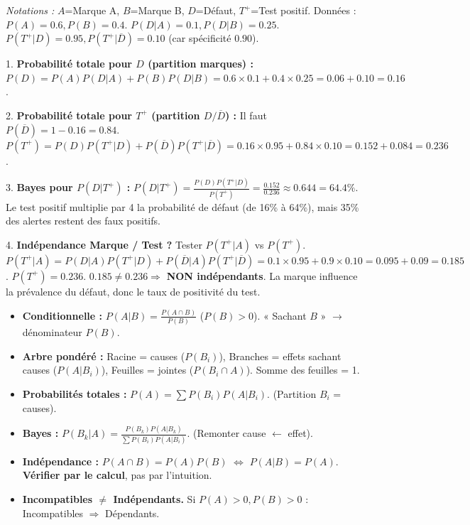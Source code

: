 \documentclass[11pt]{article}
\begin{document}
\begin{corrige}
\emph{Notations :} $A$=Marque A, $B$=Marque B, $D$=Défaut, $T^+$=Test positif.
Données : $P(A)=\num{0,6}, P(B)=\num{0,4}$. $P(D|A)=\num{0,1}, P(D|B)=\num{0,25}$.
$P(T^+|D)=\num{0,95}, P(T^+|\overline{D})=\num{0,10}$ (car spécificité $\num{0,90}$).

1. \textbf{Probabilité totale pour $D$ (partition marques) :}
$P(D) = P(A)P(D|A) + P(B)P(D|B) = \num{0,6}\times\num{0,1} + \num{0,4}\times\num{0,25} = \num{0,06} + \num{0,10} = \num{0,16}$.

2. \textbf{Probabilité totale pour $T^+$ (partition $D/\overline{D}$) :}
Il faut $P(\overline{D}) = 1 - \num{0,16} = \num{0,84}$.
$P(T^+) = P(D)P(T^+|D) + P(\overline{D})P(T^+|\overline{D}) = \num{0,16}\times\num{0,95} + \num{0,84}\times\num{0,10} = \num{0,152} + \num{0,084} = \num{0,236}$.

3. \textbf{Bayes pour $P(D|T^+)$ :}
$P(D|T^+) = \frac{P(D)P(T^+|D)}{P(T^+)} = \frac{\num{0,152}}{\num{0,236}} \approx \num{0,644} = \num{64,4}\%$.
Le test positif multiplie par 4 la probabilité de défaut (de \num{16}\% à \num{64}\%), mais \num{35}\% des alertes restent des faux positifs.

4. \textbf{Indépendance Marque / Test ?}
Tester $P(T^+|A)$ vs $P(T^+)$.
$P(T^+|A) = P(D|A)P(T^+|D) + P(\overline{D}|A)P(T^+|\overline{D}) = \num{0,1}\times\num{0,95} + \num{0,9}\times\num{0,10} = \num{0,095} + \num{0,09} = \num{0,185}$.
$P(T^+) = \num{0,236}$.
$\num{0,185} \neq \num{0,236} \Rightarrow$ \textbf{NON indépendants}. La marque influence la prévalence du défaut, donc le taux de positivité du test.
\end{corrige}

\begin{aretenir}
\begin{itemize}
    \item \textbf{Conditionnelle :} $P(A|B) = \frac{P(A\cap B)}{P(B)}$ ($P(B)>0$). « Sachant $B$ » $\to$ dénominateur $P(B)$.
    \item \textbf{Arbre pondéré :} Racine = causes ($P(B_i)$), Branches = effets sachant causes ($P(A|B_i)$), Feuilles = jointes ($P(B_i\cap A)$). Somme des feuilles = 1.
    \item \textbf{Probabilités totales :} $P(A) = \sum P(B_i)P(A|B_i)$. (Partition $B_i$ = causes).
    \item \textbf{Bayes :} $P(B_k|A) = \frac{P(B_k)P(A|B_k)}{\sum P(B_i)P(A|B_i)}$. (Remonter cause $\leftarrow$ effet).
    \item \textbf{Indépendance :} $P(A\cap B) = P(A)P(B)$ $\iff$ $P(A|B)=P(A)$. \textbf{Vérifier par le calcul}, pas par l'intuition.
    \item \textbf{Incompatibles $\neq$ Indépendants.} Si $P(A)>0, P(B)>0$ : Incompatibles $\Rightarrow$ Dépendants.
\end{itemize}
\end{aretenir}
\end{document}
